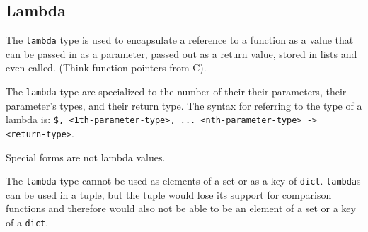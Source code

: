 
\subsection{Lambda}
{
	The \texttt{lambda} type is used to encapsulate a reference to
	a function as a value that can be passed in as a parameter, passed out as a
	return value, stored in lists and even called. (Think function pointers from C).
	
	The \texttt{lambda} type are specialized to the number of their their
	parameters, their parameter's types, and their return type.
	The syntax for referring to the type of a lambda
	is: \texttt{\$<0th-parameter-type>, <1th-parameter-type>, ... <nth-parameter-type> -> <return-type>}.
	
	Special forms are not lambda values.
	
	The \texttt{lambda} type cannot be used as elements of a set or
	as a key of \texttt{dict}. \texttt{lambda}s can be used in a 
	tuple, but the tuple
	would lose its support for comparison functions and therefore would
	also not be able to be an element of a set or a key of a \texttt{dict}.
}
